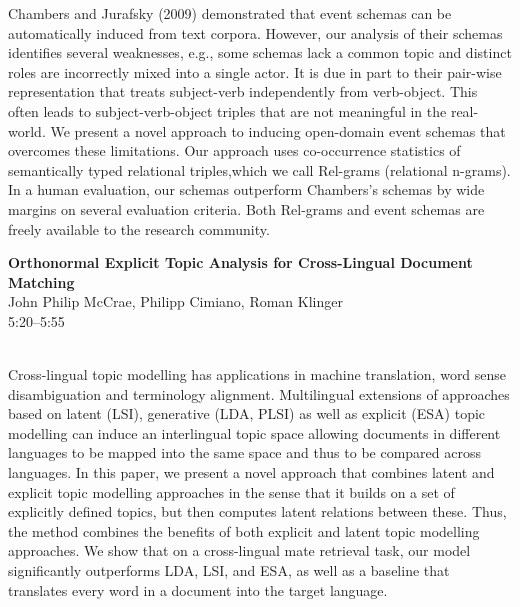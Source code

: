 \documentclass[twoside,makeidx]{book}
\begin{document}
\nopagebreak%
\noindent%
{\small Chambers and Jurafsky (2009) demonstrated that event schemas can be automatically induced from text corpora. However, our analysis of their schemas identifies several weaknesses, e.g., some schemas lack a common topic and distinct roles are incorrectly mixed into a single actor. It is due in part to their pair-wise representation that treats subject-verb independently from verb-object. This often leads to subject-verb-object triples that are not meaningful in the real-world.  We present a novel approach to inducing open-domain event schemas that overcomes these limitations. Our approach uses co-occurrence statistics of semantically typed relational triples,which we call Rel-grams (relational n-grams). In a human evaluation, our schemas outperform Chambers's schemas by wide margins on several evaluation criteria.  Both Rel-grams and event schemas are freely available to the research community.}
\par\vspace{2em}\noindent%
\begin{minipage}{\linewidth}%
\begin{center}
\textbf{\normalsize Orthonormal Explicit Topic Analysis for Cross-Lingual Document Matching}\\
\normalsize  John Philip McCrae,  Philipp Cimiano,  Roman Klinger\\
{\small 5:20--5:55}\\
\end{center}
\end{minipage}\\[0.5em]
\nopagebreak%
\noindent%
{\small Cross-lingual topic modelling has applications in machine translation, word sense disambiguation and terminology alignment. Multilingual extensions of approaches based on latent (LSI), generative (LDA, PLSI) as well as explicit (ESA) topic modelling can induce an interlingual topic space allowing documents in different languages to be mapped into the same space and thus to be compared across languages. In this paper, we present a novel approach that combines latent and explicit topic modelling approaches in the sense that it builds on a set of explicitly defined topics, but then computes latent relations between these. Thus, the method combines the benefits of both explicit and latent topic modelling approaches. We show that on a cross-lingual mate retrieval task, our model significantly outperforms LDA, LSI, and ESA, as well as a baseline that translates every word in a document into the target language.}
\clearpage
\end{document}
